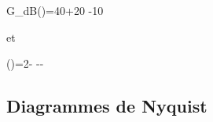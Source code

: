 \begin{bequation}
G_{dB}(\omega)=40+20
                 -10
\end{bequation}
et
\begin{bequation}
\phi(\omega)=2\arctan{\tau_3\omega}-\arctan{\tau_1\omega}
             -\arctan{\tau_2\omega}-\arctan{\tau_4\omega} 
\end{bequation}
\clearpage

\captionsetup{width=0.9\linewidth}
\subsection{Diagrammes de Nyquist}
